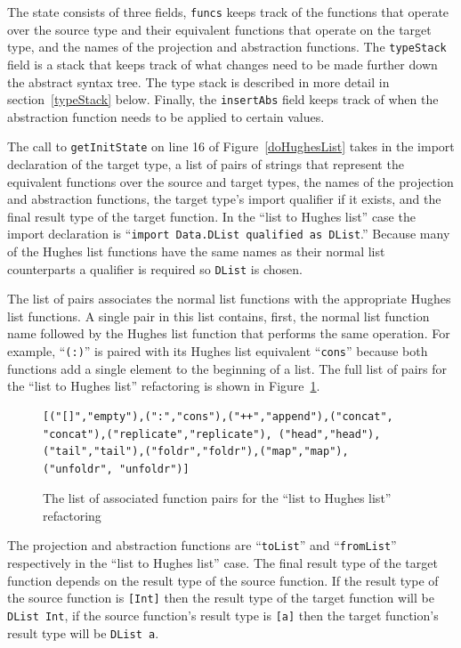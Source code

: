 The state consists of three fields, \texttt{funcs} keeps track of the functions that operate over the source type and their equivalent functions that operate on the target type, and the names of the projection and abstraction functions. The \texttt{typeStack} field is a stack that keeps track of what changes need to be made further down the abstract syntax tree. The type stack is described in more detail in section~\ref{typeStack} below. Finally, the \texttt{insertAbs} field keeps track of when the abstraction function needs to be applied to certain values.

The call to \texttt{getInitState} on line 16 of Figure~\ref{doHughesList} takes in the import declaration of the target type, a list of pairs of strings that represent the equivalent functions over the source and target types, the names of the projection and abstraction functions, the target type's import qualifier if it exists, and the final result type of the target function. In the ``list to Hughes list'' case the import declaration is ``\texttt{import Data.DList qualified as DList}.'' Because many of the Hughes list functions have the same names as their normal list counterparts a qualifier is required so \texttt{DList} is chosen. 

The list of pairs associates the normal list functions with the appropriate Hughes list functions. A single pair in this list contains, first, the normal list function name followed by the Hughes list function that performs the same operation. For example, ``\texttt{(:)}'' is paired with its Hughes list equivalent ``\texttt{cons}'' because both functions add a single element to the beginning of a list. The full list of pairs for the ``list to Hughes list'' refactoring is shown in Figure~\ref{assocFuns}.

\begin{figure}[t]
\begin{lstlisting}
[("[]","empty"),(":","cons"),("++","append"),("concat", "concat"),("replicate","replicate"), ("head","head"),("tail","tail"),("foldr","foldr"),("map","map"), ("unfoldr", "unfoldr")]
\end{lstlisting}
\caption{The list of associated function pairs for the ``list to Hughes list'' refactoring}
\label{assocFuns}
\end{figure} 

The projection and abstraction functions are ``\texttt{toList}'' and ``\texttt{fromList}'' respectively in the ``list to Hughes list'' case. The final result type of the target function depends on the result type of the source function. If the result type of the source function is \texttt{[Int]} then the result type of the target function will be \texttt{DList Int}, if the source function's result type is \texttt{[a]} then the target function's result type will be \texttt{DList a}.

